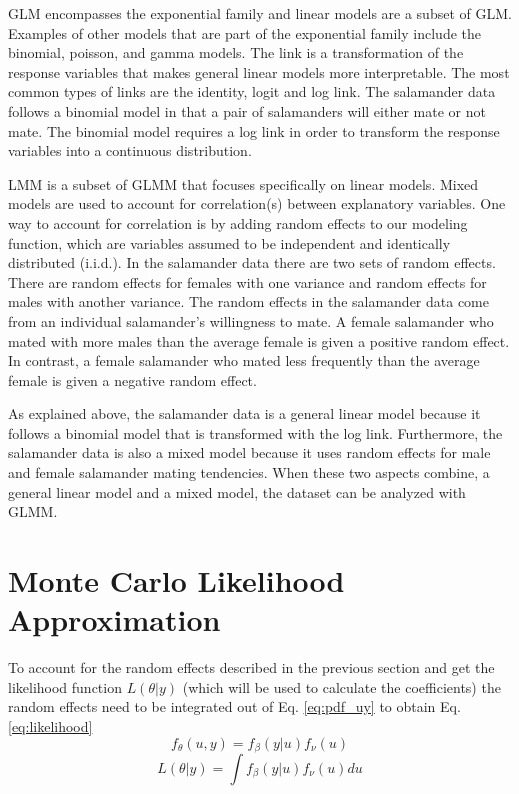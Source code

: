 \documentclass{article}
\begin{document}
GLM encompasses the exponential family and linear models are a subset of GLM.  Examples of other models that are part of the exponential family include the binomial, poisson, and gamma models.  The link is a transformation of the response variables that makes general linear models more interpretable.  The most common types of links are the identity, logit and log link.  The salamander data follows a binomial model in that a pair of salamanders will either mate or not mate.  The binomial model requires a log link in order to transform the response variables into a continuous distribution.
	
LMM is a subset of GLMM that focuses specifically on linear models.  Mixed models are used to account for correlation(s) between explanatory variables.  One way to account for correlation is by adding random effects to our modeling function, which are variables assumed to be independent and identically distributed (i.i.d.).  In the salamander data there are two sets of random effects.  There are random effects for females with one variance and random effects for males with another variance.  The random effects in the salamander data come from an individual salamander’s willingness to mate.  A female salamander who mated with more males than the average female is given a positive random effect.  In contrast, a female salamander who mated less frequently than the average female is given a negative random effect. 
	
As explained above, the salamander data is a general linear model because it follows a binomial model that is transformed with the log link.  Furthermore, the salamander data is also a mixed model because it uses random effects for male and female salamander mating tendencies.  When these two aspects combine, a general linear model and a mixed model, the dataset can be analyzed with GLMM. 

\section{Monte Carlo Likelihood Approximation}
To account for the random effects described in the previous section and get the likelihood function $L(\theta|y)$ (which will be used to calculate the coefficients) the random effects need to be integrated out of Eq. \ref{eq:pdf_uy} to obtain Eq.\ref{eq:likelihood} \\
\begin{equation}
f_\theta(u,y) = f_\beta(y|u)f_\nu(u)
\label{eq:pdf_uy}
\end{equation}
\begin{equation}
L(\theta{}|y) = \int f_\beta(y|u)f_\nu(u)du
\label{eq:likelihood}
\end{equation}
\end{document}
